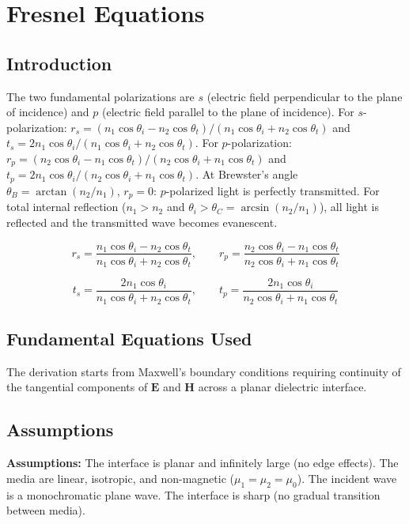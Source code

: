 \chapter{Fresnel Equations}

\section*{Introduction}

The two fundamental polarizations are $s$ (electric field perpendicular to the plane of incidence) and $p$ (electric field parallel to the plane of incidence). For $s$-polarization: $r_s = (n_1\cos\theta_i - n_2\cos\theta_t)/(n_1\cos\theta_i + n_2\cos\theta_t)$ and $t_s = 2n_1\cos\theta_i/(n_1\cos\theta_i + n_2\cos\theta_t)$. For $p$-polarization: $r_p = (n_2\cos\theta_i - n_1\cos\theta_t)/(n_2\cos\theta_i + n_1\cos\theta_t)$ and $t_p = 2n_1\cos\theta_i/(n_2\cos\theta_i + n_1\cos\theta_t)$. At Brewster's angle $\theta_B = \arctan(n_2/n_1)$, $r_p = 0$: $p$-polarized light is perfectly transmitted. For total internal reflection ($n_1 > n_2$ and $\theta_i > \theta_C = \arcsin(n_2/n_1)$), all light is reflected and the transmitted wave becomes evanescent.


\[
r_s = \frac{n_1\cos\theta_i - n_2\cos\theta_t}{n_1\cos\theta_i + n_2\cos\theta_t},\qquad r_p = \frac{n_2\cos\theta_i - n_1\cos\theta_t}{n_2\cos\theta_i + n_1\cos\theta_t}
\]

\[
t_s = \frac{2n_1\cos\theta_i}{n_1\cos\theta_i + n_2\cos\theta_t},\qquad t_p = \frac{2n_1\cos\theta_i}{n_2\cos\theta_i + n_1\cos\theta_t}
\]

\section*{Fundamental Equations Used}

The derivation starts from Maxwell's boundary conditions requiring continuity of the tangential components of $\mathbf{E}$ and $\mathbf{H}$ across a planar dielectric interface.

\section*{Assumptions}

\textbf{Assumptions:} The interface is planar and infinitely large (no edge effects). The media are linear, isotropic, and non-magnetic ($\mu_1 = \mu_2 = \mu_0$). The incident wave is a monochromatic plane wave. The interface is sharp (no gradual transition between media).


